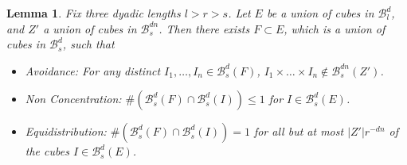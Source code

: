 \documentclass[usenames,dvipsnames]{article}
\theoremstyle{plain}
\newtheorem{lemma}{Lemma}
\theoremstyle{plain}
\begin{document}
\begin{lemma}
	Fix three dyadic lengths $l > r > s$. Let $E$ be a union of cubes in $\mathcal{B}^d_l$, and $Z'$ a union of cubes in $\mathcal{B}^{dn}_s$. Then there exists $F \subset E$, which is a union of cubes in $\mathcal{B}^d_s$, such that
	\begin{itemize}
		\item \emph{Avoidance}:  For any distinct $I_1, \dots, I_n \in \mathcal{B}^d_s(F)$, $I_1 \times \dots \times I_n \not \in \mathcal{B}^{dn}_s(Z')$.
		\item \emph{Non Concentration}: $\# (\mathcal{B}^d_s(F) \cap \mathcal{B}^d_s(I)) \leq 1$ for $I \in \mathcal{B}^d_s(E)$.
		\item \emph{Equidistribution}: $\# (\mathcal{B}^d_s(F) \cap \mathcal{B}^d_s(I)) = 1$ for all but at most $|Z'| r^{-dn}$ of the cubes $I \in \mathcal{B}^d_s(E)$.
	\end{itemize}
\end{lemma}
\end{document}
